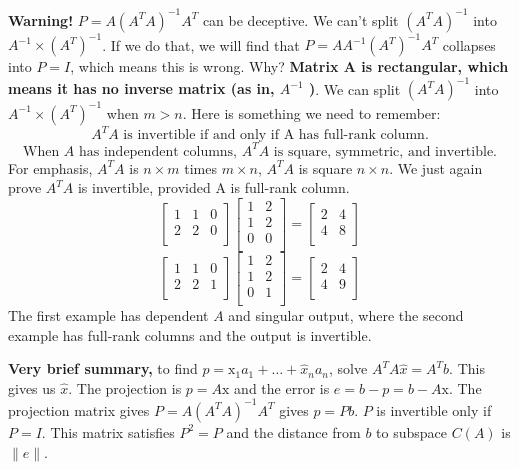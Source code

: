 \textbf{Warning!} \(P = A(A^T A)^{-1} A^T \) can be deceptive. We can't split \((A^T A)^{-1} \) into \(A^{-1} \times (A^T)^{-1}  \). If we do that, we will find that \(P = AA^{-1}(A^T)^{-1} A^T  \) collapses into \(P = I\), which means this is wrong. Why? \textbf{Matrix A is rectangular, which means it has no inverse matrix (as in, \(A^{-1} \) )}. We can split \((A^T A)^{-1} \) into \(A^{-1} \times (A^T)^{-1} \) when \(m > n\). 
Here is something we need to remember: 
\[
    \text{\(A^T A\) is invertible if and only if A has full-rank column.}
\]          
\[
    \text{When \(A\) has independent columns, \(A^T A\) is square, symmetric, and invertible.}
\]
For emphasis, \(A^T A\) is \(n \times m\) times \(m \times n\), \(A^T A\) is square \(n \times n\). We just again prove \(A^T A\) is invertible, provided A is full-rank column. 
\[
    \begin{bmatrix}
        1 & 1 & 0  \\
        2 & 2 & 0  \\
    \end{bmatrix}
    \begin{bmatrix}
        1 & 2  \\
        1 & 2  \\
        0 & 0  \\
    \end{bmatrix}
    = 
    \begin{bmatrix}
        2 & 4   \\
        4 & 8  \\
    \end{bmatrix}
\]      
\[
    \begin{bmatrix}
        1 & 1 & 0  \\
        2 & 2 & 1  \\
    \end{bmatrix}
    \begin{bmatrix}
        1 & 2  \\
        1 & 2  \\
        0 & 1  \\
    \end{bmatrix}
    = 
    \begin{bmatrix}
        2 & 4  \\
        4 & 9  \\
    \end{bmatrix}
\]
The first example has dependent \(A\) and singular output, where the second example has full-rank columns and the output is invertible. 

\textbf{Very brief summary,} to find \(p = \text{x}_1 a_1 + \ldots + \hat{x}_n a_n\), solve \(A^T A\hat{x} = A^T b\). This gives us \(\hat{x}\). The projection is \(p = A\text{x}\) and the error is \(e = b - p = b - A\text{x}\). The projection matrix gives \(P = A(A^T A)^{-1} A^T \) gives \(p = Pb\). \(P\) is invertible only if \(P = I\). 
This matrix satisfies \(P^2 = P\) and the distance from \(b\) to subspace \(C(A)\) is \(\lVert e \rVert \).

